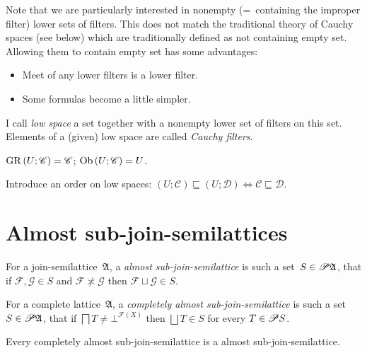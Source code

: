 \begin{rem}
Note that we are particularly interested in nonempty (=~containing the improper filter) lower sets of filters.
This does not match the traditional theory of Cauchy spaces (see below) which are traditionally defined as not containing empty set.
Allowing them to contain empty set has some advantages:
\begin{itemize}
\item Meet of any lower filters is a lower filter.
\item Some formulas become a little simpler.
\end{itemize}
\end{rem}


\begin{defn}
  I call \emph{low space} a set together with a nonempty lower set of
  filters on this set.
  Elements of a (given) low space are called \emph{Cauchy filters}.
\end{defn}

\begin{defn}
  $\operatorname{GR} \left( U ; \mathscr{C} \right) = \mathscr{C}$; $\operatorname{Ob} \left(
  U ; \mathscr{C} \right) = U$.
\end{defn}

\begin{defn}
  Introduce an order on low spaces: $\left( U ; \mathscr{C} \right)
  \sqsubseteq \left( U ; \mathscr{D} \right) \Leftrightarrow \mathscr{C}
  \sqsubseteq \mathscr{D}$.
\end{defn}

\section{Almost sub-join-semilattices}

\begin{defn}
For a join-semilattice~$\mathfrak{A}$, a \emph{almost sub-join-semilattice} is such a set~$S\in\mathscr{P}\mathfrak{A}$, that
if $\mathcal{F},\mathcal{G}\in S$ and $\mathcal{F} \nasymp \mathcal{G}$ then $\mathcal{F} \sqcup \mathcal{G}\in S$.
\end{defn}

\begin{defn}
For a complete lattice~$\mathfrak{A}$, a \emph{completely almost sub-join-semilattice} is such a set~$S\in\mathscr{P}\mathfrak{A}$, that
if $\bigsqcap T \neq \bot^{\mathscr{F}(X)}$ then $\bigsqcup T\in S$ for every $T\in\mathscr{P} S$.
\end{defn}

\begin{obvious}
Every completely almost sub-join-semilattice is a almost sub-join-semilattice.
\end{obvious}

